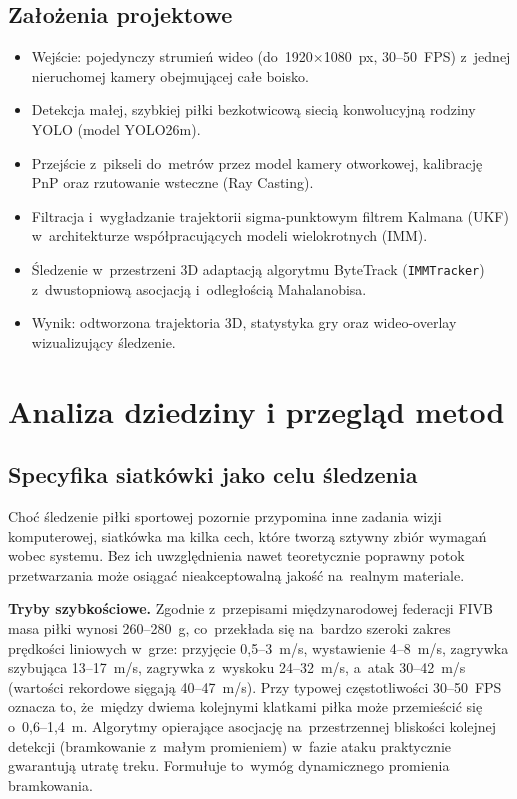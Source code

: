 \documentclass[14pt,a4paper]{extarticle}
\begin{document}
\subsection{Założenia projektowe}
\begin{itemize}[leftmargin=1.4em, itemsep=2pt]
  \item Wejście: pojedynczy strumień wideo (do~1920$\times$1080~px, 30--50~FPS)
        z~jednej nieruchomej kamery obejmującej całe boisko.
  \item Detekcja małej, szybkiej piłki bezkotwicową siecią konwolucyjną
        rodziny YOLO (model YOLO26m).
  \item Przejście z~pikseli do~metrów przez model kamery otworkowej, kalibrację
        PnP oraz rzutowanie wsteczne (Ray Casting).
  \item Filtracja i~wygładzanie trajektorii sigma-punktowym filtrem Kalmana (UKF)
        w~architekturze współpracujących modeli wielokrotnych (IMM).
  \item Śledzenie w~przestrzeni 3D adaptacją algorytmu ByteTrack
        (\texttt{IMMTracker}) z~dwustopniową asocjacją i~odległością Mahalanobisa.
  \item Wynik: odtworzona trajektoria 3D, statystyka gry oraz wideo-overlay
        wizualizujący śledzenie.
\end{itemize}

\section{Analiza dziedziny i przegląd metod}

\subsection{Specyfika siatkówki jako celu śledzenia}
Choć śledzenie piłki sportowej pozornie przypomina inne zadania wizji komputerowej,
siatkówka ma kilka cech, które tworzą sztywny zbiór wymagań wobec systemu. Bez ich
uwzględnienia nawet teoretycznie poprawny potok przetwarzania może osiągać nieakceptowalną
jakość na~realnym materiale.

\textbf{Tryby szybkościowe.} Zgodnie z~przepisami międzynarodowej federacji FIVB masa piłki
wynosi 260--280~g, co~przekłada się na~bardzo szeroki zakres prędkości liniowych w~grze:
przyjęcie 0,5--3~m/s, wystawienie 4--8~m/s, zagrywka szybująca 13--17~m/s, zagrywka
z~wyskoku 24--32~m/s, a~atak 30--42~m/s (wartości rekordowe sięgają 40--47~m/s). Przy
typowej częstotliwości 30--50~FPS oznacza to, że~między dwiema kolejnymi klatkami piłka
może przemieścić się o~0,6--1,4~m. Algorytmy opierające asocjację na~przestrzennej
bliskości kolejnej detekcji (bramkowanie z~małym promieniem) w~fazie ataku praktycznie
gwarantują utratę treku. Formułuje to~wymóg dynamicznego promienia bramkowania.
\end{document}
